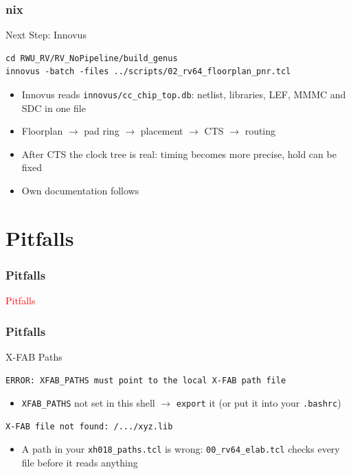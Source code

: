 \documentclass{beamer}
\newcommand{\astitle}{nix}
\newcommand{\assubtitle}{nix}
\newcommand{\cmd}[1]{\texttt{#1}}
\begin{document}
\renewcommand{\assubtitle}{Next Step: Innovus}
\begin{frame}[fragile]
\frametitle{\astitle}
\begin{block}{\assubtitle}
\begin{lstlisting}[style=sh]
cd RWU_RV/RV_NoPipeline/build_genus
innovus -batch -files ../scripts/02_rv64_floorplan_pnr.tcl
\end{lstlisting}
  \begin{itemize}
    \item Innovus reads \cmd{innovus/cc\_chip\_top.db}: netlist, libraries,
      LEF, MMMC and SDC in one file
    \item Floorplan $\rightarrow$ pad ring $\rightarrow$ placement
      $\rightarrow$ CTS $\rightarrow$ routing
    \item After CTS the clock tree is real: timing becomes more precise,
      hold can be fixed
    \item Own documentation follows
  \end{itemize}
\end{block}
\end{frame}

\section{Pitfalls}
\renewcommand{\astitle}{Pitfalls}
\begin{frame}
\frametitle{\astitle}
\textcolor{red}{Pitfalls}
\end{frame}

\renewcommand{\assubtitle}{X-FAB Paths}
\begin{frame}[fragile]
\frametitle{\astitle}
\begin{block}{\assubtitle}
\begin{lstlisting}
ERROR: XFAB_PATHS must point to the local X-FAB path file
\end{lstlisting}
  \begin{itemize}
    \item \cmd{XFAB\_PATHS} not set in this shell $\rightarrow$ \cmd{export} it
      (or put it into your \cmd{.bashrc})
  \end{itemize}
\begin{lstlisting}
X-FAB file not found: /.../xyz.lib
\end{lstlisting}
  \begin{itemize}
    \item A path in your \cmd{xh018\_paths.tcl} is wrong: \cmd{00\_rv64\_elab.tcl}
      checks every file before it reads anything
  \end{itemize}
\end{block}
\end{frame}
\end{document}
